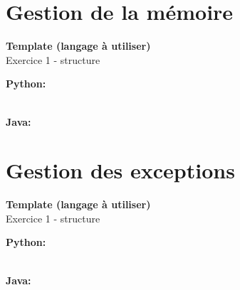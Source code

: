 \section{Gestion de la mémoire}

\begin{Exercice}[5 minutes] \textbf{Template (langage à utiliser)}\\
    Exercice 1 - structure \\
    
     \begin{conseil}
         
     \end{conseil}
     \begin{solution}
     
     \textbf{Python:} 
     
     \textbf{\\Java:} 
        
         
     \end{solution}   
 \end{Exercice}

\section{Gestion des exceptions}

\begin{Exercice}[5 minutes] \textbf{Template (langage à utiliser)}\\
    Exercice 1 - structure \\
    
     \begin{conseil}
         
     \end{conseil}
     \begin{solution}
     
     \textbf{Python:} 
     
     \textbf{\\Java:} 
        
         
     \end{solution}   
 \end{Exercice}




